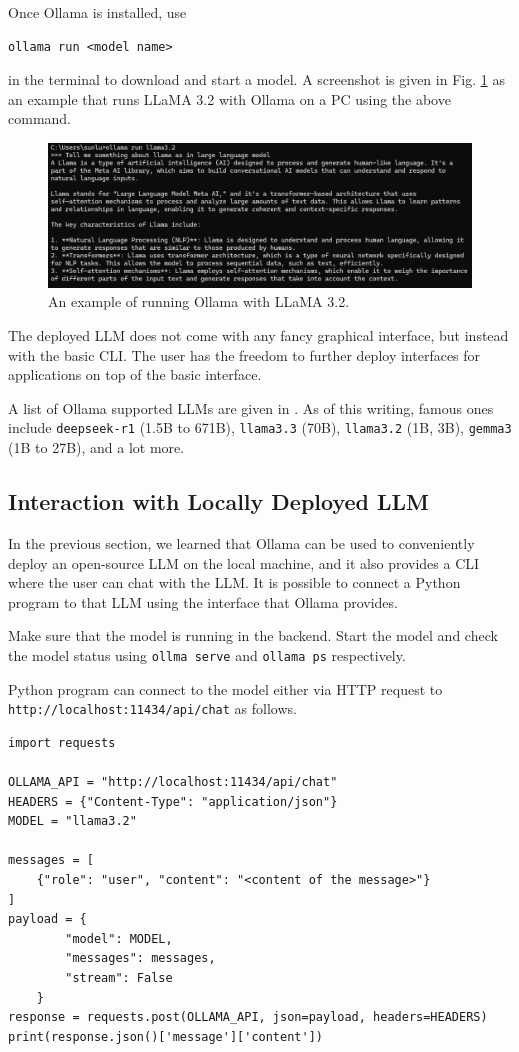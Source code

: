 Once Ollama is installed, use
\begin{lstlisting}
ollama run <model name>
\end{lstlisting}
in the terminal to download and start a model. A screenshot is given in Fig. \ref{fig:ollama_llama32} as an example that runs LLaMA 3.2 with Ollama on a PC using the above command.

\begin{figure}[!htb]
	\centering
	\includegraphics[width=\textwidth]{./chapters/part-4/figures/ollama_llama32.png}
	\caption{An example of running Ollama with LLaMA 3.2.}
	\label{fig:ollama_llama32}
\end{figure}

The deployed LLM does not come with any fancy graphical interface, but instead with the basic CLI. The user has the freedom to further deploy interfaces for applications on top of the basic interface. 

A list of Ollama supported LLMs are given in \cite{ollama2025library}. As of this writing, famous ones include \verb|deepseek-r1| (1.5B to 671B), \verb|llama3.3| (70B), \verb|llama3.2| (1B, 3B), \verb|gemma3| (1B to 27B), and a lot more. 

\subsection{Interaction with Locally Deployed LLM}

In the previous section, we learned that Ollama can be used to conveniently deploy an open-source LLM on the local machine, and it also provides a CLI where the user can chat with the LLM. It is possible to connect a Python program to that LLM using the interface that Ollama provides.

Make sure that the model is running in the backend. Start the model and check the model status using \verb|ollma serve| and \verb|ollama ps| respectively.

Python program can connect to the model either via HTTP request to \verb|http://localhost:11434/api/chat| as follows.
\begin{lstlisting}
import requests

OLLAMA_API = "http://localhost:11434/api/chat"
HEADERS = {"Content-Type": "application/json"}
MODEL = "llama3.2"

messages = [
    {"role": "user", "content": "<content of the message>"}
]
payload = {
        "model": MODEL,
        "messages": messages,
        "stream": False
    }
response = requests.post(OLLAMA_API, json=payload, headers=HEADERS)
print(response.json()['message']['content'])
\end{lstlisting}

